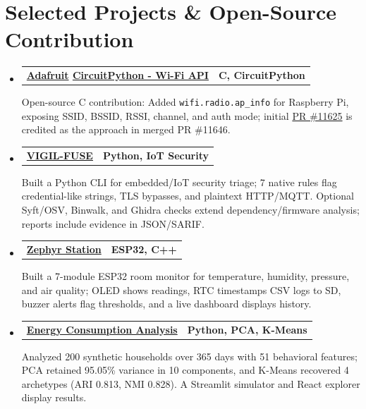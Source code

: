 \documentclass[a4paper,10pt]{article}
\makeatletter
\newcommand{\resumeProjectItem}[3]{
  \item\normalsize{
    \begin{tabular*}{0.97\textwidth}{l@{\extracolsep{\fill}}r}
      \textbf{#1} & \textbf{#3} \\
    \end{tabular*}
    \vspace{-2pt}
    #2
  }
}
\newcommand{\resumeSubHeadingListStart}{\begin{itemize}[leftmargin=*]}
\newcommand{\resumeSubHeadingListEnd}{\end{itemize}}
\makeatother
\begin{document}
\section{Selected Projects \& Open-Source Contribution}
\resumeSubHeadingListStart
\resumeProjectItem{\href{https://www.adafruit.com}{Adafruit} \href{https://github.com/adafruit/circuitpython/pull/11646}{CircuitPython - Wi-Fi API}}{Open-source C contribution: Added \texttt{wifi.radio.ap\_info} for Raspberry Pi, exposing SSID, BSSID, RSSI, channel, and auth mode; initial \href{https://github.com/adafruit/circuitpython/pull/11625}{PR \#11625} is credited as the approach in merged PR \#11646.}{C, CircuitPython}
\vspace{1pt}
\resumeProjectItem{\href{https://github.com/VIGIL-IoT/VIGIL-FUSE}{VIGIL-FUSE}}{Built a Python CLI for embedded/IoT security triage; 7 native rules flag credential-like strings, TLS bypasses, and plaintext HTTP/MQTT. Optional Syft/OSV, Binwalk, and Ghidra checks extend dependency/firmware analysis; reports include evidence in JSON/SARIF.}{Python, IoT Security}
\vspace{2pt}
\resumeProjectItem{\href{https://github.com/shaxntanu/Zephyr-Station}{Zephyr Station}}{Built a 7-module ESP32 room monitor for temperature, humidity, pressure, and air quality; OLED shows readings, RTC timestamps CSV logs to SD, buzzer alerts flag thresholds, and a live dashboard displays history.}{ESP32, C++}
\vspace{1pt}
\resumeProjectItem{\href{https://github.com/shaxntanu/Energy-Consumption-Pattern-Analysis-using-PCA-and-K-Means}{Energy Consumption Analysis}}{Analyzed 200 synthetic households over 365 days with 51 behavioral features; PCA retained 95.05\% variance in 10 components, and K-Means recovered 4 archetypes (ARI 0.813, NMI 0.828). A Streamlit simulator and React explorer display results.}{Python, PCA, K-Means}
\resumeSubHeadingListEnd

\vspace{-5pt}
\end{document}
